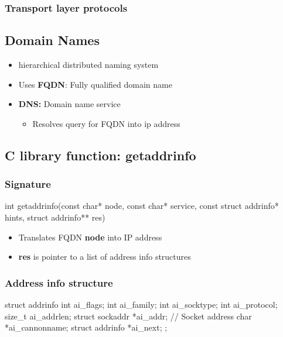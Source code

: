 \documentclass{report}
\begin{document}
     \bigbreak \noindent 
     \subsubsection{Transport layer protocols}
     \bigbreak \noindent 

    \pagebreak 
    \bigbreak \noindent 
    \subsection{Domain Names}
    \bigbreak \noindent 
    \begin{itemize}
        \item hierarchical distributed naming system
        \item Uses \textbf{FQDN}: Fully qualified domain name
        \item \textbf{DNS:} Domain name service
            \begin{itemize}
                \item Resolves query for FQDN into ip address
            \end{itemize}
    \end{itemize}
    \bigbreak \noindent 
    \subsection{C library function: getaddrinfo}
    \bigbreak \noindent 
    \subsubsection{Signature}
    \bigbreak \noindent 
    \begin{cppcode}
        int getaddrinfo(const char* node, const char* service, const struct addrinfo* hints, struct addrinfo** res)
    \end{cppcode}
    \bigbreak \noindent 
    \begin{itemize}
        \item Translates FQDN \textbf{node} into IP address
        \item \textbf{res} is pointer to a list of address info structures
    \end{itemize}
    \bigbreak \noindent 

    \bigbreak \noindent 
    \subsubsection{Address info structure}
    \bigbreak \noindent 
    \begin{cppcode}
        struct addrinfo {
            int                 ai_flags;
            int                 ai_family;
            int                 ai_socktype;
            int                 ai_protocol;
            size_t              ai_addrlen;
            struct sockaddr     *ai_addr; // Socket address
            char                *ai_cannonname;
            struct addrinfo     *ai_next;
        };
    \end{cppcode}
    \bigbreak \noindent 
\end{document}
